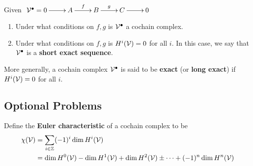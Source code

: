 \begin{ques}
  Given $\xymatrix{ \V^\bullet= 0 \ar[r] & A \ar^f[r] & B \ar^g[r] &  C \ar[r] & 0}$
  \begin{enumerate}
    \item Under what conditions on $ f,g$ is $ \mathcal{V}^\bullet$ a cochain complex.
    \item Under what conditions on $ f,g$ is $ H^i(\mathcal{V}) = 0$ for all $ i$. In this case, we say that $ \mathcal{V}^\bullet$ is a \textbf{short exact sequence}.
  \end{enumerate}
\end{ques}

\begin{definition}
  More generally, a cochain complex $ \mathcal{V}^\bullet$ is said to be \textbf{exact} (or \textbf{long exact}) if $H^i(\mathcal{V}) = 0$ for all $ i$.
\end{definition}
\newpage

\subsection*{Optional Problems}
\begin{definition}
  Define the \textbf{Euler characteristic} of a cochain complex to be
  \begin{align*}
    \chi(\mathcal{V})
    &= \sum_{i \in \mathbb{Z}} (-1)^i \dim H^i(\mathcal{V}) \\
    &= \dim H^0(\mathcal{V}) - \dim H^1(\mathcal{V}) +  \dim H^2(\mathcal{V}) \pm \cdots + (-1)^n \dim  H^n(\mathcal{V})
  \end{align*}
\end{definition}

